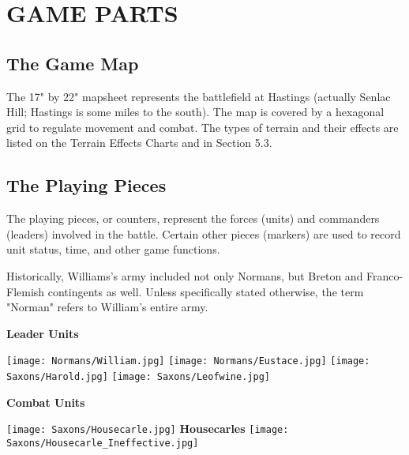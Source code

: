 \section{GAME PARTS}

\subsection{The Game Map}

The 17" by 22" mapsheet represents the battlefield at Hastings (actually Senlac Hill; Hastings is some miles to the south). The map is covered by a hexagonal grid to regulate movement and combat. The types of terrain and their effects are listed on the Terrain Effects Charts and in Section 5.3.

\subsection{The Playing Pieces}

The playing pieces, or counters, represent the forces (units) and commanders (leaders) involved in the battle. Certain other pieces (markers) are used to record unit status, time, and other game functions.

Historically, Williams's army included not only Normans, but Breton and Franco-Flemish contingents as well. Unless specifically stated otherwise, the term "Norman" refers to William's entire army.

\begin{center}
\textbf{Leader Units}
\end{center}
\par
\hspace{1em}
\texttt{[image: Normans/William.jpg]}
\hspace{1em}
\texttt{[image: Normans/Eustace.jpg]}
\hspace{1em}
\texttt{[image: Saxons/Harold.jpg]}
\hspace{1em}
\texttt{[image: Saxons/Leofwine.jpg]}

\par
\begin{center}
  \textbf{Combat Units}
  \break
\end{center}

\begin{center}
  \texttt{[image: Saxons/Housecarle.jpg]}
  \hspace{1em}
  \textbf{Housecarles}
  \hspace{1em}
  \texttt{[image: Saxons/Housecarle\_Ineffective.jpg]}
\end{center}

